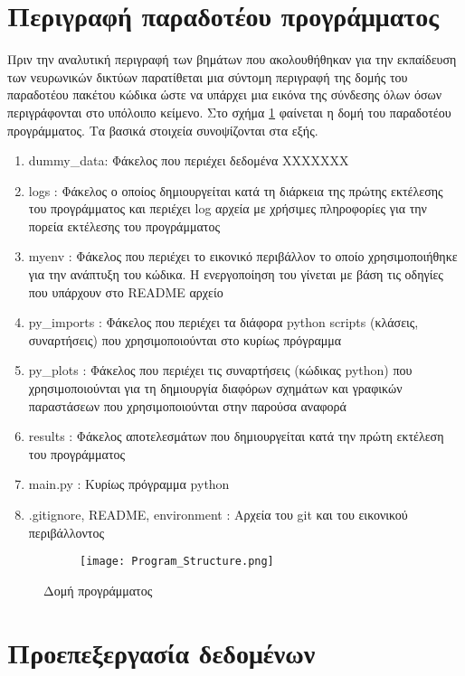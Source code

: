 \section{Περιγραφή παραδοτέου προγράμματος}
\label{Package Structure}

Πριν την αναλυτική περιγραφή των βημάτων που ακολουθήθηκαν για την εκπαίδευση των νευρωνικών δικτύων παρατίθεται μια σύντομη περιγραφή της δομής του παραδοτέου πακέτου κώδικα ώστε να υπάρχει μια εικόνα της σύνδεσης όλων όσων περιγράφονται στο υπόλοιπο κείμενο. Στο σχήμα \ref{Package_Structure_image} φαίνεται η δομή του παραδοτέου προγράμματος. Τα βασικά στοιχεία συνοψίζονται στα εξής.

\begin{enumerate}
\item dummy\_data: Φάκελος που περιέχει δεδομένα ΧΧΧΧΧΧΧ
\item logs :  Φάκελος ο οποίος δημιουργείται κατά τη διάρκεια της πρώτης εκτέλεσης του προγράμματος και περιέχει log αρχεία με χρήσιμες πληροφορίες για την πορεία εκτέλεσης του προγράμματος
\item myenv : Φάκελος που περιέχει το εικονικό περιβάλλον το οποίο χρησιμοποιήθηκε για την ανάπτυξη του κώδικα. Η ενεργοποίηση του γίνεται με βάση τις οδηγίες που υπάρχουν στο README αρχείο 
\item py\_imports :  Φάκελος που περιέχει τα διάφορα python scripts (κλάσεις, συναρτήσεις) που χρησιμοποιούνται στο κυρίως πρόγραμμα
\item py\_plots :  Φάκελος που περιέχει τις συναρτήσεις (κώδικας python) που χρησιμοποιούνται για τη δημιουργία διαφόρων σχημάτων και γραφικών παραστάσεων που χρησιμοποιούνται στην παρούσα αναφορά
\item results : Φάκελος αποτελεσμάτων που δημιουργείται κατά την πρώτη εκτέλεση του προγράμματος
\item main.py : Κυρίως πρόγραμμα python
\item .gitignore, README, environment : Αρχεία του git και του εικονικού περιβάλλοντος
\end{enumerate}


\begin{figure}[H]
\centering
\begin{subfigure}[t]{0.3\textwidth}%
\texttt{[image: Program\_Structure.png]}
\end{subfigure}
\caption{Δομή προγράμματος}
\label{Package_Structure_image}
\end{figure}


\section{Προεπεξεργασία δεδομένων}
\label{Data pre-processing}

